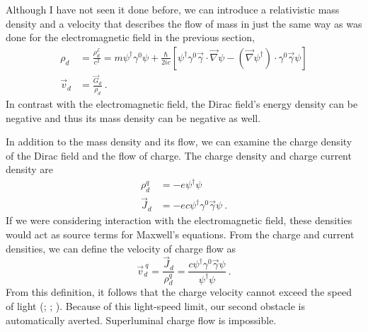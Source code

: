 \documentclass[12pt,secnumarabic,amsmath,amssymb,balancelastpage,nofootinbib]{article}
\begin{document}
Although I have not seen it done before, we can introduce a relativistic mass density and a velocity that describes the flow of mass in just the same way as was done for the electromagnetic field in the previous section,
\begin{align}
\rho_d&=\frac{\rho_d^{\mathcal{E}}}{c^2}=m \psi^\dagger\gamma^0\psi + \frac{\hbar}{2i c}\left[\psi^\dagger\gamma^0\vec{\gamma}\cdot\vec{\nabla}\psi-(\vec{\nabla} \psi^\dagger)\cdot\gamma^0\vec{\gamma}\psi\right] 
\label{diracmassdensity}
\\
\vec{v}_d&=\frac{\vec{G}_d}{\rho_d}\ .
\label{diracvelocity}
\end{align}
In contrast with the electromagnetic field, the Dirac field's energy density can be negative and thus its mass density can be negative as well.

In addition to the mass density and its flow, we can examine the charge density of the Dirac field and the flow of charge.  The charge density and charge current density are
\begin{align}
\rho^q_d&=-e \psi^\dagger \psi
\label{diracchargedensity}
\\
\vec{J}_d&=-e c \psi^\dagger \gamma^{0} \vec{\gamma} \psi
\label{diraccurrentdensity}\ .
\end{align}
If we were considering interaction with the electromagnetic field, these densities would act as source terms for Maxwell's equations.  From the charge and current densities, we can define the velocity of charge flow as
\begin{equation}
\vec{v}_d^{\:q}=\frac{\vec{J}_d}{\rho^q_d}=\frac{c \psi^\dagger \gamma^{0} \vec{\gamma} \psi}{\psi^\dagger \psi}\ .
\label{diracchargevelocity}
\end{equation}
From this definition, it follows that the charge velocity cannot exceed the speed of light (\citealp[section 2b]{takabayasi1957}; \citealp[section 10.4]{bohmhiley}; \citealp[section 12.2]{holland}).  Because of this light-speed limit, our second obstacle is automatically averted.  Superluminal charge flow is impossible.
\end{document}

